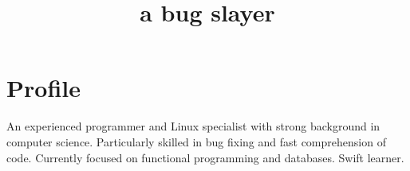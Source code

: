 \documentclass[11pt,a4paper]{moderncv}
\title{a bug slayer}
\begin{document}
\maketitle

\section{Profile}{
An experienced programmer and Linux specialist with strong background in
computer science. Particularly skilled in bug fixing and fast comprehension of
code. Currently focused on functional programming and databases. Swift
learner.
\addtolength{\leftskip}{1cm}
\addtolength{\rightskip}{1cm}\par}

\newcommand{\FI}{\href{http://www.fi.muni.cz/}{Masaryk University, Faculty of
    Informatics}}
\newcommand{\MATH}{\href{http://math.muni.cz/}{Masaryk University, Faculty of
    Sciences, Department of Mathematics and Statistics}}

\vfil
\end{document}
